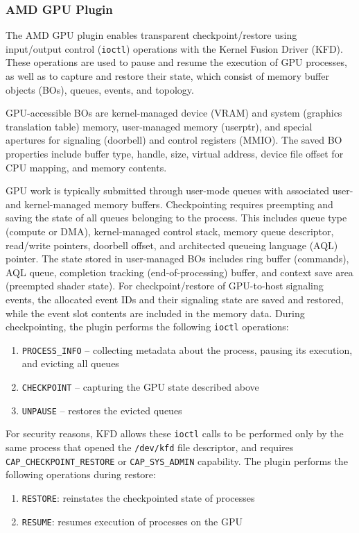 
\subsubsection{AMD GPU Plugin}\label{sec:amd-gpu-plugin}
The AMD GPU plugin enables transparent checkpoint/restore using input/output control (\texttt{ioctl}) operations with the Kernel Fusion Driver (KFD). These operations are used to pause and resume the execution of GPU processes, as well as to capture and restore their state, which consist of memory buffer objects (BOs), queues, events, and topology.

GPU-accessible BOs are kernel-managed device (VRAM) and system (graphics translation table) memory, user-managed memory (userptr), and special apertures for signaling (doorbell) and control registers (MMIO). The saved BO properties include buffer type, handle, size, virtual address, device file offset for CPU mapping, and memory contents.

GPU work is typically submitted through user-mode queues with associated user- and kernel-managed memory buffers.
Checkpointing requires preempting and saving the state of all queues belonging to the process.
This includes queue type (compute or DMA), kernel-managed control stack, memory queue descriptor, read/write pointers, doorbell offset, and architected queueing language (AQL) pointer.
The state stored in user-managed BOs includes ring buffer (commands), AQL queue, completion tracking (end-of-processing) buffer, and context save area (preempted shader state).
%
For checkpoint/restore of GPU-to-host signaling events, the allocated event IDs and their signaling state are saved and restored, while the event slot contents are included in the memory data.
%
During checkpointing, the plugin performs the following \texttt{ioctl} operations:
\begin{enumerate}[label=\itshape(\roman*\upshape), nosep]
    \item \texttt{PROCESS\_INFO} -- collecting metadata about the process, pausing its execution, and evicting all queues

    \item \texttt{CHECKPOINT} -- capturing the GPU state described above

    \item \texttt{UNPAUSE} -- restores the evicted queues
\end{enumerate}
%
For security reasons, KFD allows these \texttt{ioctl} calls to be performed only by the same process that opened the \texttt{/dev/kfd} file descriptor, and requires \texttt{CAP\_CHECKPOINT\_RESTORE} or \texttt{CAP\_SYS\_ADMIN} capability.
% 
The plugin performs the following operations during restore:
\begin{enumerate}[label=\itshape(\roman*\upshape),nosep]
    \item \texttt{RESTORE}: reinstates the checkpointed state of processes
    \item \texttt{RESUME}: resumes execution of processes on the GPU
\end{enumerate}

